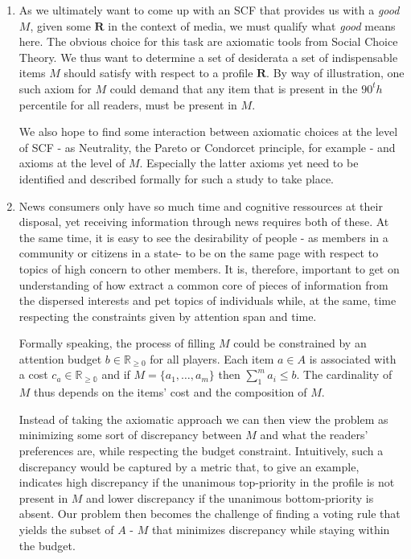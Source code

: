\documentclass[10pt,a4paper, english]{article}
\begin{document}
\begin{enumerate}
\item As we ultimately want to come up with an SCF that provides us with a \textit{good} $M$, given some $\mathbf{R}$ in the context of media, we must qualify what \textit{good} means here. The obvious choice for this task are axiomatic tools from Social Choice Theory. We thus want to determine a set of desiderata a set of indispensable items $M$ should satisfy with respect to a profile $\mathbf{R}$. By way of illustration, one such axiom for $M$ could demand that any item that is present in the $90^th$ percentile for all readers, must be present in $M$.

We also hope to find some interaction between axiomatic choices at the level of SCF - as Neutrality, the Pareto or Condorcet principle, for example - and axioms at the level of $M$. Especially the latter axioms yet need to be identified and described formally for such a study to take place.
\item News consumers only have so much time and cognitive ressources at their disposal, yet receiving information through news requires both of these. At the same time, it is easy to see the desirability of people - as members in a community or citizens in a state- to be on the same page with respect to topics of high concern to other members. It is, therefore, important to get on understanding of how extract a common core of pieces of information from the dispersed interests and pet topics of individuals while, at the same, time respecting the constraints given by attention span and time.

Formally speaking, the process of filling $M$ could be constrained by an attention budget $b\in \mathbb{R}_{\geq 0}$ for all players. Each item $a\in A$ is associated with a cost $c_a\in \mathbb{R_{\geq 0}}$ and if $M=\{a_1, \dots ,a_m\}$ then $\sum_1^m a_i \leq b$. The cardinality of $M$ thus depends on the items' cost and the composition of $M$.

Instead of taking the axiomatic approach we can then view the problem as minimizing some sort of discrepancy between $M$ and what the readers' preferences are, while respecting the budget constraint. Intuitively, such a discrepancy would be captured by a metric that, to give an example, indicates high discrepancy if the unanimous top-priority in the profile is not present in $M$ and lower discrepancy if the unanimous bottom-priority is absent. Our problem then becomes the challenge of finding a voting rule that yields the subset of $A$ - $M$ that minimizes discrepancy while staying within the budget.


\end{enumerate}
\end{document}
